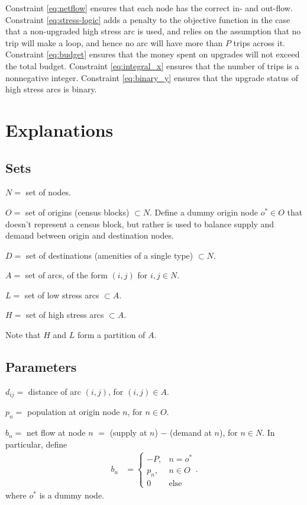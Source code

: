 \documentclass[12pt,letterpaper]{article}
\begin{document}
Constraint \ref{eq:netflow} ensures that each node has the correct in- and out-flow. 
Constraint \ref{eq:stress-logic} adds a penalty to the objective function in the case that a non-upgraded high stress arc is used, and relies on the assumption that no trip will make a loop, and hence no arc will have more than $P$ trips across it. 
Constraint \ref{eq:budget} ensures that the money spent on upgrades will not exceed the total budget. 
Constraint \ref{eq:integral_x} ensures that the number of trips is a nonnegative integer. 
Constraint \ref{eq:binary_y} ensures that the upgrade status of high stress arcs is binary. 



\section{Explanations}


\subsection{Sets} 

$N=$ set of nodes.

$O = $ set of origins (census blocks) $\subset N$. Define a dummy origin node $o^*\in O$ that doesn't represent a census block, but rather is used to balance supply and demand between origin and destination nodes. 

$D= $ set of destinations (amenities of a single type) $\subset N$.

$A = $ set of arcs, of the form $(i,j)$ for $i,j\in N$.

$L= $ set of low stress arcs $\subset A$.

$H= $ set of high stress arcs $\subset A$.

Note that $H$ and $L$ form a partition of $A$. 

\subsection{Parameters}

$d_{ij}=$ distance of arc $(i,j)$, for $(i,j)\in A$. 

$p_n=$ population at origin node $n$, for $n\in O$. 

$b_n=$ net flow at node $n$ $=$ (supply at $n$) $-$ (demand at $n$), for $n\in N$. In particular, define
\begin{align*}
    b_n &= \left\{\begin{array}{ll}
        -P, & n=o^* \\
        p_n, & n\in O  \\
        0 & \mbox{else}
    \end{array}\right.  .
\end{align*}
where $o^*$ is a dummy node. 
\end{document}
